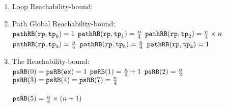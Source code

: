 \begin{enumerate}
    \item Loop Reachability-bound:
    \\
    \item Path Global Reachability-bound:
    \\
    $\mathtt{pathRB}(\mathtt{rp}, \mathtt{tp}_0) = 1$ \quad
    $\mathtt{pathRB}(\mathtt{rp}, \mathtt{tp}_1) = \frac{n}{4}$ \quad
    $\mathtt{pathRB}(\mathtt{rp}, \mathtt{tp}_2) = \frac{n}{4} \times n$ \\
    $\mathtt{pathRB}(\mathtt{rp}, \mathtt{tp}_3) = \frac{n}{4}$ \quad
    $\mathtt{pathRB}(\mathtt{rp}, \mathtt{tp}_5) = \frac{n}{4}$ \quad
    $\mathtt{pathRB}(\mathtt{rp}, \mathtt{tp}_4) = 1$
    \item The Reachability-bound:
    \\
    $\mathtt{psRB}(0) = \mathtt{psRB}(\mathtt{ex}) = 1$ \quad
    $\mathtt{psRB}(1) = \frac{n}{2} + 1$ \quad
    $\mathtt{psRB}(2) = \frac{n}{2} $ \\
    $\mathtt{psRB}(3) = \mathtt{psRB}(4) = \mathtt{psRB}(7) = \frac{n}{4} $ \\
     \\
    $\mathtt{psRB}(5) =  \frac{n}{4} \times (n + 1)$
  \end{enumerate}